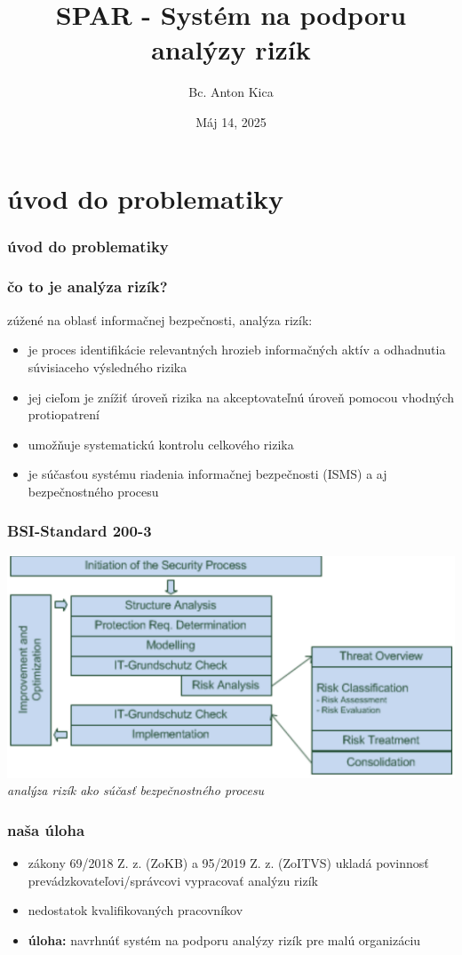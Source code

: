 \documentclass[11pt,xcolor={dvipsnames},hyperref={pdftex,pdfpagemode=UseNone,hidelinks,pdfdisplaydoctitle=true},usepdftitle=false]{beamer}
\title[SPAR]{SPAR - Systém na podporu analýzy rizík}
\author[A.~Kica]{Bc. Anton Kica}
\institute[FMFI]{FMFI\\Univerzita Komenského v Bratislave}
\date{Máj 14, 2025}
\begin{document}
\maketitle
\sepframe[title={Obsah}]

\section{úvod do problematiky}
\begin{frame}
  \frametitle{úvod do problematiky}
\end{frame}

\begin{frame}
  \frametitle{čo to je analýza rizík?}
  zúžené na oblasť informačnej bezpečnosti, analýza rizík:
  \begin{itemize}
    \item je proces identifikácie relevantných hrozieb informačných aktív a odhadnutia súvisiaceho výsledného rizika
    \item jej cieľom je znížiť úroveň rizika na akceptovateľnú úroveň pomocou vhodných protiopatrení
    \item umožňuje systematickú kontrolu celkového rizika
    \item je súčasťou systému riadenia informačnej bezpečnosti (ISMS) a aj bezpečnostného procesu
  \end{itemize}
\end{frame}

\begin{frame}
  \frametitle{BSI-Standard 200-3}
  \includegraphics[width=\textwidth]{images/security-process-bsi-200-3.png}
  \textit{analýza rizík ako súčasť bezpečnostného procesu}
\end{frame}

\begin{frame}
  \frametitle{naša úloha}
  \begin{itemize}
    \item zákony 69/2018 Z. z. (ZoKB) a 95/2019 Z. z. (ZoITVS) ukladá povinnosť prevádzkovateľovi/správcovi
      vypracovať analýzu rizík
    \item nedostatok kvalifikovaných pracovníkov
    \item \textbf{úloha:} navrhnúť systém na podporu analýzy rizík pre malú organizáciu
  \end{itemize}
\end{frame}
\end{document}
